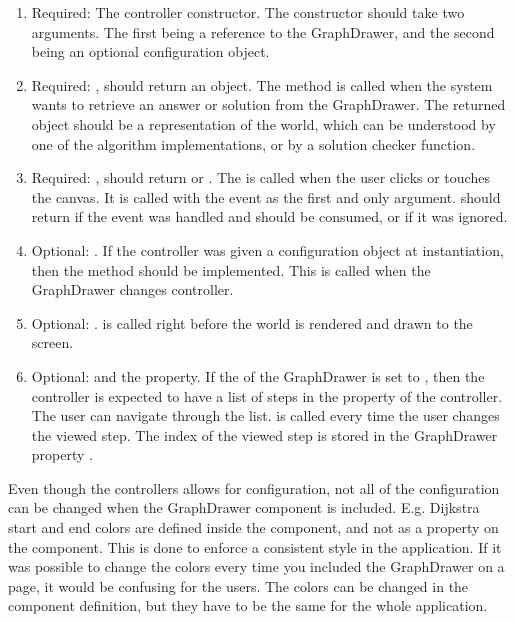\begin{enumerate}
    \item Required: The controller constructor. The constructor should take two arguments. The first being a reference to the GraphDrawer, and the second being an optional configuration object.
    \item Required: , should return an object. The  method is called when the system wants to retrieve an answer or solution from the GraphDrawer. The returned object should be a representation of the world, which can be understood by one of the algorithm implementations, or by a solution checker function.
    \item Required: , should return  or . The  is called when the user clicks or touches the canvas. It is called with the event as the first and only argument.  should return  if the event was handled and should be consumed, or  if it was ignored.
    \item Optional: . If the controller was given a configuration object at instantiation, then the  method should be implemented. This is called when the GraphDrawer changes controller.
    \item Optional: .  is called right before the world is rendered and drawn to the screen.
    \item Optional:  and the  property. If the  of the GraphDrawer is set to , then the controller is expected to have a list of steps in the  property of the controller. The user can navigate through the list.  is called every time the user changes the viewed step. The index of the viewed step is stored in the GraphDrawer property .
\end{enumerate}
Even though the controllers allows for configuration, not all of the configuration can be changed when the GraphDrawer component is included. E.g. Dijkstra start and end colors are defined inside the component, and not as a property on the component. This is done to enforce a consistent style in the application. If it was possible to change the colors every time you included the GraphDrawer on a page, it would be confusing for the users. The colors can be changed in the component definition, but they have to be the same for the whole application.










